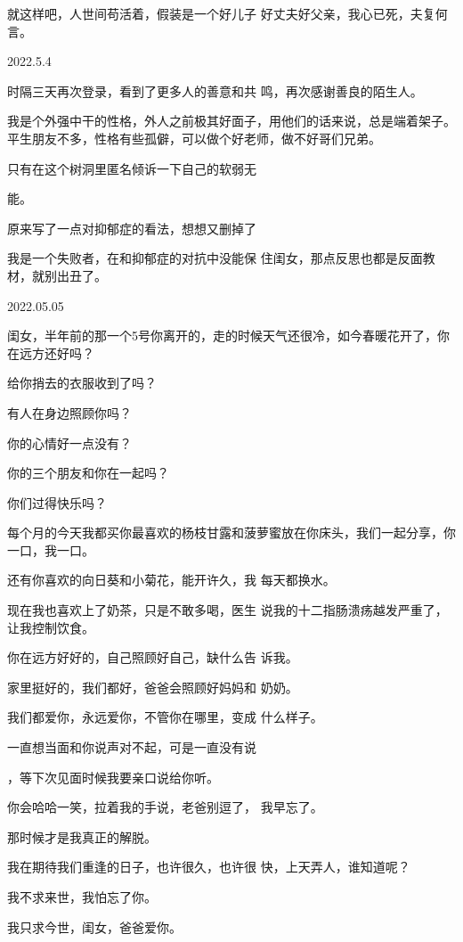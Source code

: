 \documentclass{article}
\begin{document}
就这样吧，人世间苟活着，假装是一个好儿子
好丈夫好父亲，我心已死，夫复何言。 



2022.5.4 

时隔三天再次登录，看到了更多人的善意和共
鸣，再次感谢善良的陌生人。 

我是个外强中干的性格，外人之前极其好面子，用他们的话来说，总是端着架子。平生朋友不多，性格有些孤僻，可以做个好老师，做不好哥们兄弟。

只有在这个树洞里匿名倾诉一下自己的软弱无

\newpage
能。 

原来写了一点对抑郁症的看法，想想又删掉了

我是一个失败者，在和抑郁症的对抗中没能保
住闺女，那点反思也都是反面教材，就别出丑了。 



2022.05.05 

闺女，半年前的那一个5号你离开的，走的时候天气还很冷，如今春暖花开了，你在远方还好吗？


给你捎去的衣服收到了吗？ 


有人在身边照顾你吗？ 


你的心情好一点没有？ 


你的三个朋友和你在一起吗？ 


\newpage

你们过得快乐吗？ 

每个月的今天我都买你最喜欢的杨枝甘露和菠萝蜜放在你床头，我们一起分享，你一口，我一口。

还有你喜欢的向日葵和小菊花，能开许久，我
每天都换水。 

现在我也喜欢上了奶茶，只是不敢多喝，医生
说我的十二指肠溃疡越发严重了，让我控制饮食。 

你在远方好好的，自己照顾好自己，缺什么告
诉我。 

家里挺好的，我们都好，爸爸会照顾好妈妈和
奶奶。 

我们都爱你，永远爱你，不管你在哪里，变成
什么样子。 

一直想当面和你说声对不起，可是一直没有说

\newpage
，等下次见面时候我要亲口说给你听。 

你会哈哈一笑，拉着我的手说，老爸别逗了，
我早忘了。 


那时候才是我真正的解脱。 

我在期待我们重逢的日子，也许很久，也许很
快，上天弄人，谁知道呢？ 


我不求来世，我怕忘了你。 


我只求今世，闺女，爸爸爱你。 
\end{document}
